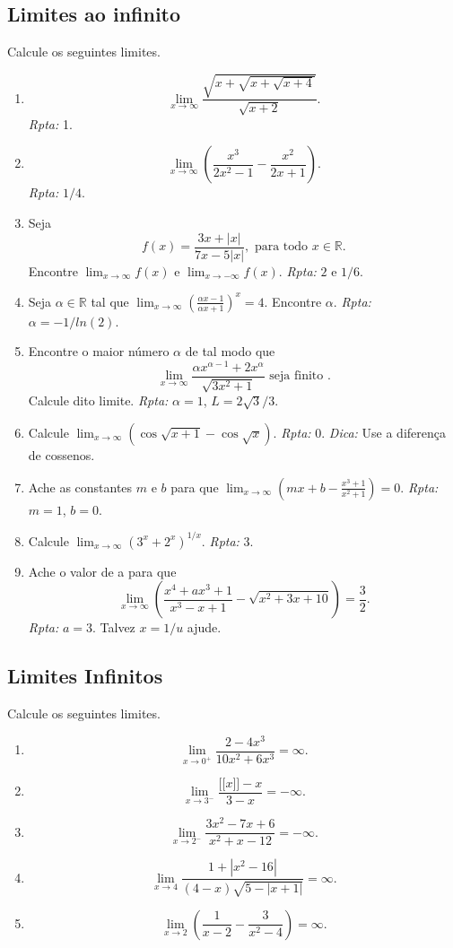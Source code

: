 \documentclass[latin,20pt]{article}
\begin{document}
    \subsection{Limites ao infinito}   
   Calcule os seguintes limites.  
    \begin{enumerate}
    \item $$\lim_{x \rightarrow \infty} 
    \frac{\sqrt{x+\sqrt{x+\sqrt{x+4}}}}{\sqrt{x+2}}. $$
    {\it Rpta: } 1.    
     \item $$\lim_{x \rightarrow \infty} 
    \left( \frac{x^3}{2x^2-1}-\frac{x^2}{2x+1}\right). $$
    {\it Rpta:  }$1/4$.
    \item Seja 
    $$
    f(x)=\frac{3x+|x|}{7x-5|x|}, \text{ para todo } x \in \mathbb{R}.
    $$ 
    Encontre 
    $\lim_{x \rightarrow \infty} f(x)$ e 
    $\lim_{x \rightarrow -\infty} f(x)$.
    {\it Rpta: } $2$ e $1/6$. 
    \item Seja $\alpha \in \mathbb{R}$ tal que 
    $\lim_{x \rightarrow \infty} 
    \left( \frac{\alpha x-1}
    {\alpha x +1}\right)^{x}=4$. Encontre $\alpha$. {\it Rpta: } 
    $\alpha=-1/ln(2)$.
     \item Encontre o maior número $\alpha$ de tal modo que 
    $$\lim_{x \rightarrow \infty} 
    \frac{\alpha x^{\alpha-1}+2x^{\alpha}}
    {\sqrt{3x^2+1}} \text{ seja finito }.$$
    Calcule dito limite. {\it Rpta: } $\alpha=1$, $L=2\sqrt{3}/3$.
     \item Calcule 
     $\lim_{x \rightarrow \infty} \left( \cos\sqrt{x+1}
     -\cos \sqrt{x} \right)$. {\it Rpta: } 0. {\it Dica:} Use a diferença de cossenos. 
    \item Ache as constantes $m$ e $b$ para que 
    $\lim_{x \rightarrow \infty} \left( mx+b- 
    \frac{x^3+1}{x^2+1}\right)=0$. {\it Rpta: } $m=1$, $b=0$. 
    \item Calcule 
    $\lim_{x \rightarrow \infty} \left(3^{x}+2^{x}\right)^{1/x}$. 
    {\it Rpta:} 3.
    \item Ache o valor de a para que 
    $$ \lim_{x \rightarrow \infty} 
    \left( 
    \frac{x^4+ax^3+1}{x^3-x+1}- 
    \sqrt{x^2+3x+10}
    \right)=\frac{3}{2}. $$
    {\it Rpta: } $a=3$. Talvez $x=1/u$ ajude.
    \end{enumerate}
    \subsection{Limites Infinitos}   
   Calcule os seguintes limites.  
    \begin{enumerate}
    \item $$\lim_{x \rightarrow 0^{+}} \frac{2-4x^{3}}{10x^{2}+6x^{3}}=\infty. $$
    \item $$\lim_{x \rightarrow 3^{-}} 
    \frac{\lbrack\!\lbrack x\rbrack\!\rbrack -x}{3-x}=-\infty. $$
    \item $$\lim_{x \rightarrow 2^{-}} 
    \frac{3x^{2}-7x+6}{x^2+x-12}=-\infty. $$
    \item $$\lim_{x \rightarrow 4} 
    \frac{1+|x^{2}-16|}{(4-x)\sqrt{5-|x+1|}}=\infty. $$
    \item $$\lim_{x \rightarrow 2} 
    \left( \frac{1}{x-2}-\frac{3}{x^2-4} \right)=\infty. $$
    \end{enumerate}
\end{document}
